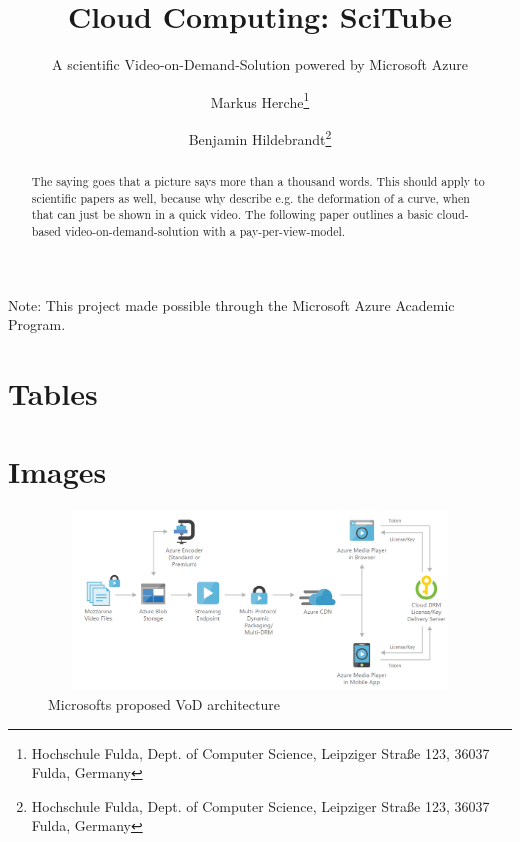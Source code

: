 \documentclass[english]{lni}
\begin{document}
\title{Cloud Computing: SciTube}
\subtitle{A scientific Video-on-Demand-Solution powered by Microsoft Azure}
\author[Markus Herche \and Benjamin Hildebrandt]
{Markus Herche\footnote{Hochschule Fulda, Dept. of Computer Science, Leipziger Straße 123, 36037 Fulda,
Germany } \and
Benjamin Hildebrandt\footnote{Hochschule Fulda, Dept. of Computer Science, Leipziger Straße 123, 36037 Fulda,
Germany
}}



\maketitle

\begin{abstract}
    The saying goes that a picture says more than a thousand words. This should apply to scientific papers as well,
    because why describe e.g. the deformation of a curve, when that can just be shown in a quick video. The following 
    paper outlines a basic cloud-based video-on-demand-solution with a pay-per-view-model. 
\end{abstract}

Note: This project made possible through the Microsoft Azure Academic Program.








\newpage
\appendix

\section*{Tables}

\newpage

\newpage

\section*{Images}
\begin{figure}[ht]
    \centering
    \includegraphics[width=1\textwidth, height=180px]{ressources/architecture_ms.png}
    \caption{Microsofts proposed VoD architecture}
    \label{fig:arch_ms}
\end{figure}
%
%

\printbibliography
\end{document}
